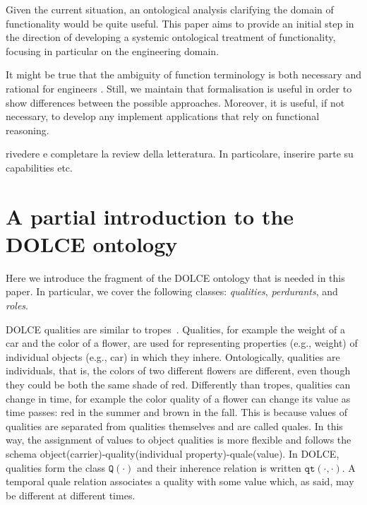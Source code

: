 \documentclass[sw]{iosart2x}
\newcommand{\generalStyle}[1]{\texttt{#1}}
\newcommand{\biRel}[3]{\generalStyle{#1}(#2,#3)}
\newcommand{\uniRel}[2]{\generalStyle{#1}(#2)}
\newcommand{\DOLCE}{\textsc{DOLCE}\xspace} %
\newcommand{\DOLCEQuality}[1]{\uniRel{Q}{#1}}
\newcommand{\DOLCEQualityDirect}[2]{\biRel{qt}{#1}{#2}}
\newcommand{\firstTimeKeyWord}[1]{\textit{#1}}
\newcommand{\TODO}[1]{{\color{red} #1}}
\newcommand{\TODOinline}[1]{{\color{red} #1}}
\begin{document}
Given the current situation, an ontological analysis clarifying the domain of functionality would be quite useful.
This paper aims to provide an initial step in the direction of developing a systemic ontological treatment of functionality, focusing in particular on the engineering domain.

It might be true that the ambiguity of function terminology is both necessary and rational for engineers \cite{vermaasConceptualElusivenessEngineering2012}. 
Still, we maintain that formalisation is useful in order to show differences between the possible approaches. Moreover, it is useful, if not necessary, to develop any implement applications that rely on functional reasoning.


\TODO{rivedere e completare la review della letteratura. In particolare, inserire parte su capabilities etc.}




\section{A partial introduction to the \DOLCE ontology\label{sec:DOLCE}} 
Here we introduce the fragment of the \DOLCE ontology \cite{masoloWonderWebDeliverableD182003,borgoDOLCEDescriptiveOntology2022} that is needed in this paper. In particular, we cover the following classes: \firstTimeKeyWord{qualities}, \firstTimeKeyWord{perdurants}, and \firstTimeKeyWord{roles}. 

\DOLCE qualities are similar to tropes~\cite{Campbell90}. Qualities, for example the weight of a car and the color of a flower, are used for representing properties (e.g., weight) of individual objects (e.g., car) in which they inhere.
Ontologically, qualities are individuals, that is, the colors of two different flowers are different, even though they could be both the same shade of red.
Differently than tropes, qualities can change in time, for example the color quality of a flower can change its value as time passes: red in the summer and brown in the fall.
This is because values of qualities are separated from qualities themselves and are called quales. 
In this way, the assignment of values to object qualities is more flexible and follows the schema object(carrier)-quality(individual property)-quale(value).
In \DOLCE, qualities form the class $\DOLCEQuality{\cdot}$ and their inherence relation is written $\DOLCEQualityDirect{\cdot}{\cdot}$. A temporal quale relation associates a quality with some value which, as said, may be different at different times. 
\end{document}
